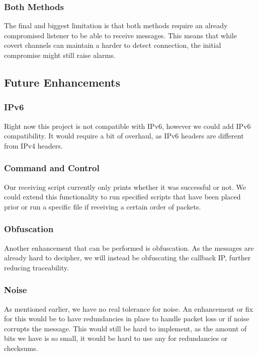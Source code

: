 \documentclass[letterpaper,twocolumn,10pt]{article}
\begin{document}
\subsubsection{Both Methods}

The final and biggest limitation is that both methods require an already compromised listener to be able to receive messages. This means that while covert channels can maintain a harder to detect connection, the initial compromise might still raise alarms.

\subsection{Future Enhancements}

\subsubsection{IPv6}

Right now this project is not compatible with IPv6, however we could add IPv6 compatibility. It would require a bit of overhaul, as IPv6 headers are different from IPv4 headers.

\subsubsection{Command and Control}

Our receiving script currently only prints whether it was successful or not. We could extend this functionality to run specified scripts that have been placed prior or run a specific file if receiving a certain order of packets.

\subsubsection{Obfuscation}

Another enhancement that can be performed is obfuscation. As the messages are already hard to decipher, we will instead be obfuscating the callback IP, further reducing traceability.

\subsubsection{Noise}

As mentioned earlier, we have no real tolerance for noise. An enhancement or fix for this would be to have redundancies in place to handle packet loss or if noise corrupts the message. This would still be hard to implement, as the amount of bits we have is so small, it would be hard to use any for redundancies or checksums.
\end{document}
